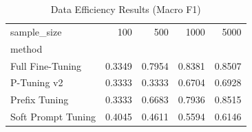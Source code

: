 \begin{table}
\caption{Data Efficiency Results (Macro F1)}
\label{tab:efficiency}
\begin{tabular}{lrrrr}
\toprule
sample_size & 100 & 500 & 1000 & 5000 \\
method &  &  &  &  \\
\midrule
Full Fine-Tuning & 0.3349 & 0.7954 & 0.8381 & 0.8507 \\
P-Tuning v2 & 0.3333 & 0.3333 & 0.6704 & 0.6928 \\
Prefix Tuning & 0.3333 & 0.6683 & 0.7936 & 0.8515 \\
Soft Prompt Tuning & 0.4045 & 0.4611 & 0.5594 & 0.6146 \\
\bottomrule
\end{tabular}
\end{table}
